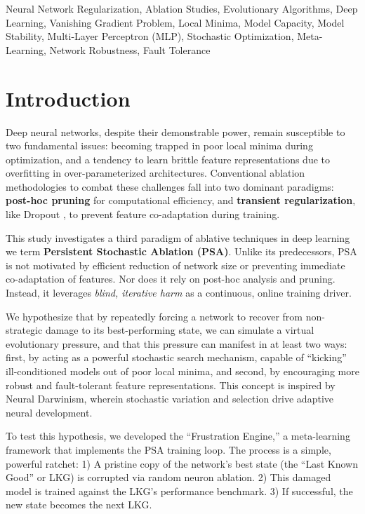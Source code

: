 \documentclass[conference]{IEEEtran}
\begin{document}
\begin{IEEEkeywords}
Neural Network Regularization, Ablation Studies, Evolutionary Algorithms, Deep Learning, Vanishing Gradient Problem, Local Minima, Model Capacity, Model Stability, Multi-Layer Perceptron (MLP), Stochastic Optimization, Meta-Learning, Network Robustness, Fault Tolerance
\end{IEEEkeywords}



\section{Introduction}

Deep neural networks, despite their demonstrable power, remain susceptible to two fundamental issues: becoming trapped in poor local minima during optimization, and a tendency to learn brittle feature representations due to overfitting in over-parameterized architectures. Conventional ablation methodologies to combat these challenges fall into two dominant paradigms: \textbf{post-hoc pruning} \cite{b1, b2} for computational efficiency, and \textbf{transient regularization}, like Dropout \cite{b3}, to prevent feature co-adaptation during training.

This study investigates a third paradigm of ablative techniques in deep learning we term \textbf{Persistent Stochastic Ablation (PSA)}. Unlike its predecessors, PSA is not motivated by efficient reduction of network size or preventing immediate co-adaptation of features. Nor does it rely on post-hoc analysis and pruning. Instead, it leverages \textit{blind, iterative harm} as a continuous, online training driver. 

We hypothesize that by repeatedly forcing a network to recover from non-strategic damage to its best-performing state, we can simulate a virtual evolutionary pressure, and that this pressure can manifest in at least two ways: first, by acting as a powerful stochastic search mechanism, capable of ``kicking'' ill-conditioned models out of poor local minima, and second, by encouraging more robust and fault-tolerant feature representations. This concept is inspired by Neural Darwinism\cite{b4}, wherein stochastic variation and selection drive adaptive neural development.

To test this hypothesis, we developed the ``Frustration Engine,'' a meta-learning framework that implements the PSA training loop. The process is a simple, powerful ratchet: 1) A pristine copy of the network's best state (the ``Last Known Good'' or LKG) is corrupted via random neuron ablation. 2) This damaged model is trained against the LKG's performance benchmark. 3) If successful, the new state becomes the next LKG.
\end{document}
